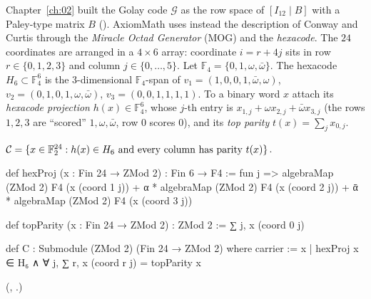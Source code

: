 Chapter~\ref{ch:02} built the Golay code $\mathcal G$ as the row space of $[I_{12}\mid B]$ with a
Paley-type matrix $B$ ().  AxiomMath uses instead the description of Conway and
Curtis through the \emph{Miracle Octad Generator} (MOG) and the \emph{hexacode}.  The $24$
coordinates are arranged in a $4\times6$ array: coordinate $i=r+4j$ sits in row $r\in\{0,1,2,3\}$
and column $j\in\{0,\dots,5\}$.  Let $\mathbb F_4=\{0,1,\omega,\bar\omega\}$.  The hexacode
$H_6\subset\mathbb F_4^6$ is the $3$-dimensional $\mathbb F_4$-span of
$v_1=(1,0,0,1,\bar\omega,\omega)$, $v_2=(0,1,0,1,\omega,\bar\omega)$, $v_3=(0,0,1,1,1,1)$.  To a binary
word $x$ attach its \emph{hexacode projection} $h(x)\in\mathbb F_4^6$, whose $j$-th entry is
$x_{1,j}+\omega x_{2,j}+\bar\omega x_{3,j}$ (the rows $1,2,3$ are ``scored'' $1,\omega,\bar\omega$,
row $0$ scores $0$), and its \emph{top parity} $t(x)=\sum_jx_{0,j}$.

\begin{definition}\label{ch21:def:C}
$\mathcal{C}=\{x\in\mathbb{F}_2^{24}: h(x)\in H_6\ \text{and every column has parity}\ t(x)\}$.
\end{definition}
\begin{leancode}
def hexProj (x : Fin 24 → ZMod 2) : Fin 6 → F4 := fun j =>
  algebraMap (ZMod 2) F4 (x (coord 1 j)) + α * algebraMap (ZMod 2) F4 (x (coord 2 j)) +
    ᾱ * algebraMap (ZMod 2) F4 (x (coord 3 j))

def topParity (x : Fin 24 → ZMod 2) : ZMod 2 := ∑ j, x (coord 0 j)
\end{leancode}
\begin{leancode}
def C : Submodule (ZMod 2) (Fin 24 → ZMod 2) where
  carrier := {x | hexProj x ∈ H₆ ∧ ∀ j, ∑ r, x (coord r j) = topParity x}
\end{leancode}
(, .)

